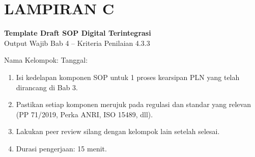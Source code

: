 \documentclass[12pt,a4paper]{report}
\begin{document}
\section*{\color{plnblue} LAMPIRAN C}
{\Large\bfseries Template Draft SOP Digital Terintegrasi}\\[0.15cm]
{\normalsize\color{medgray}Output Wajib Bab 4 -- Kriteria Penilaian 4.3.3}

\vspace{0.4cm}

\noindent Nama Kelompok: \fillline \quad Tanggal: \fillline[3cm]

\begin{wsinstruksibox}
\begin{enumerate}
    \item Isi kedelapan komponen SOP untuk 1 proses kearsipan PLN yang telah dirancang di Bab 3.
    \item Pastikan setiap komponen merujuk pada regulasi dan standar yang relevan (PP 71/2019, Perka ANRI, ISO 15489, dll).
    \item Lakukan peer review silang dengan kelompok lain setelah selesai.
    \item Durasi pengerjaan: 15 menit.
\end{enumerate}
\end{wsinstruksibox}

\vspace{0.4cm}

\begin{tcolorbox}[colback=plnblue!3, colframe=plnblue!60, sharp corners, title={\small\bfseries Komponen 1: Tujuan \& Ruang Lingkup}, boxrule=0.8pt]
\vspace{2.0cm}
\end{tcolorbox}

\vspace{0.2cm}

\begin{tcolorbox}[colback=plnblue!3, colframe=plnblue!60, sharp corners, title={\small\bfseries Komponen 2: Definisi \& Akronim}, boxrule=0.8pt]
\vspace{2.0cm}
\end{tcolorbox}

\vspace{0.2cm}
\end{document}

